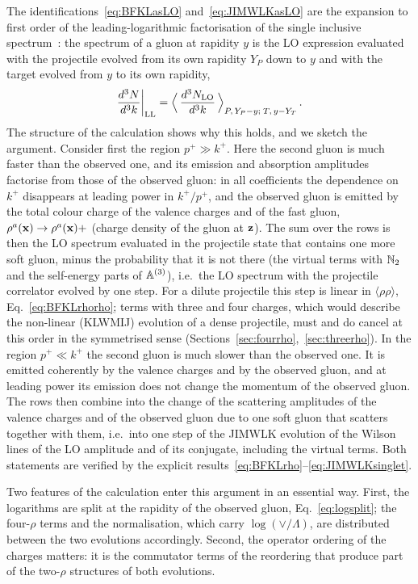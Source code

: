 The identifications~\eqref{eq:BFKLasLO} and~\eqref{eq:JIMWLKasLO} are the expansion to first order of the leading-logarithmic factorisation of the single inclusive spectrum~\cite{Kovner:2006wr,Kovner:2006ge,Gelis:2008rw}: the spectrum of a gluon at rapidity $y$ is the LO expression evaluated with the projectile evolved from its own rapidity $Y_P$ down to $y$ and with the target evolved from $y$ to its own rapidity,
\begin{align}\label{eq:LLfact}
\frac{d^3N}{d^3k}\bigg|_{\rm LL}=\Big\langle\,\frac{d^3N_{\rm LO}}{d^3k}\,\Big\rangle_{P,\,Y_P-y;\;T,\,y-Y_T}\,.
\end{align}
The structure of the calculation shows why this holds, and we sketch the argument. Consider first the region $p^+\gg k^+$. Here the second gluon is much faster than the observed one, and its emission and absorption amplitudes factorise from those of the observed gluon: in all coefficients the dependence on $k^+$ disappears at leading power in $k^+/p^+$, and the observed gluon is emitted by the total colour charge of the valence charges and of the fast gluon, $\rho^a(\mathbf{x})\to\rho^a(\mathbf{x})+$ (charge density of the gluon at $\mathbf{z}$). The sum over the rows is then the LO spectrum evaluated in the projectile state that contains one more soft gluon, minus the probability that it is not there (the virtual terms with $\mathbb{N}_2$ and the self-energy parts of $\mathbb{A}^{(3)}$), i.e.\ the LO spectrum with the projectile correlator evolved by one step. For a dilute projectile this step is linear in $\langle\rho\rho\rangle$, Eq.~\eqref{eq:BFKLrhorho}; terms with three and four charges, which would describe the non-linear (KLWMIJ) evolution of a dense projectile, must and do cancel at this order in the symmetrised sense (Sections~\ref{sec:fourrho},~\ref{sec:threerho}). In the region $p^+\ll k^+$ the second gluon is much slower than the observed one. It is emitted coherently by the valence charges and by the observed gluon, and at leading power its emission does not change the momentum of the observed gluon. The rows then combine into the change of the scattering amplitudes of the valence charges and of the observed gluon due to one soft gluon that scatters together with them, i.e.\ into one step of the JIMWLK evolution of the Wilson lines of the LO amplitude and of its conjugate, including the virtual terms. Both statements are verified by the explicit results~\eqref{eq:BFKLrho}--\eqref{eq:JIMWLKsinglet}.

Two features of the calculation enter this argument in an essential way. First, the logarithms are split at the rapidity of the observed gluon, Eq.~\eqref{eq:logsplit}; the four-$\rho$ terms and the normalisation, which carry $\log(\vee/\Lambda)$, are distributed between the two evolutions accordingly. Second, the operator ordering of the charges matters: it is the commutator terms of the reordering that produce part of the two-$\rho$ structures of both evolutions.

